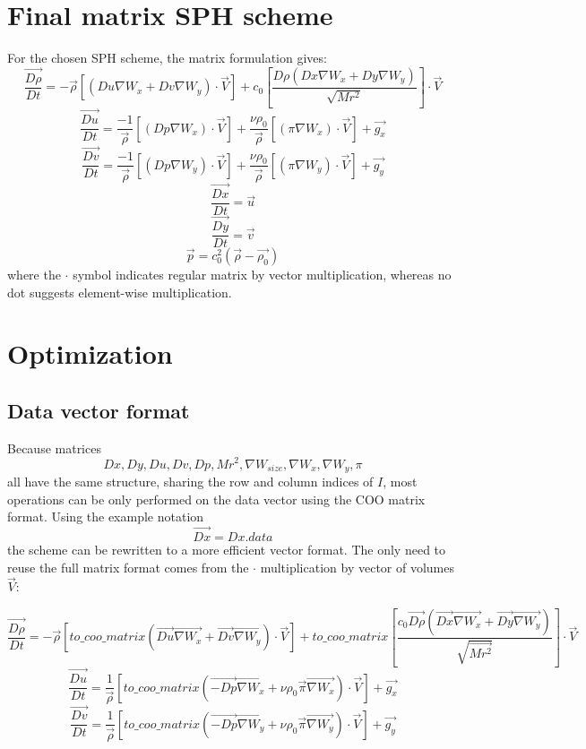 \documentclass{article}
\begin{document}
\section{Final matrix SPH scheme}
For the chosen SPH scheme, the matrix formulation gives:
$$
\overrightarrow{\frac{D\rho}{Dt}}=-\Vec{\rho}\left[\left(Du\nabla W_x + Dv \nabla W_y\right)\cdot\Vec{V}\right]
+
c_0\left[\frac{D\rho\left(Dx\nabla W_x + Dy\nabla W_y \right)}{\sqrt{Mr^2}}\right]\cdot\Vec{V}
$$
$$
\overrightarrow{\frac{Du}{Dt}}=\frac{-1}{\Vec{\rho}}\left[\left(Dp\nabla W_x\right)\cdot\Vec{V}\right]+\frac{\nu\rho_0}{\Vec{\rho}}\left[\left(\pi\nabla W_x\right)\cdot\Vec{V}\right]+\Vec{g_x}
$$
$$
\overrightarrow{\frac{Dv}{Dt}}=\frac{-1}{\Vec{\rho}}\left[\left(Dp\nabla W_y\right)\cdot\Vec{V}\right]+\frac{\nu\rho_0}{\Vec{\rho}}\left[\left(\pi\nabla W_y\right)\cdot\Vec{V}\right]+\Vec{g_y}
$$
$$\overrightarrow{\frac{Dx}{Dt}}=\Vec{u}$$
$$\overrightarrow{\frac{Dy}{Dt}}=\Vec{v}$$
$$
\vec{p}=c_0^2\left(\Vec{\rho}-\Vec{\rho_0}\right)
$$
where the $\cdot$ symbol indicates regular matrix by vector multiplication, whereas no dot suggests element-wise multiplication.
\section{Optimization}
\subsection{Data vector format}
Because matrices 
$$Dx, Dy, Du, Dv, Dp, Mr^2, \nabla W_{size}, \nabla W_x, \nabla W_y, \pi$$
all have the same structure, sharing the row and column indices of $I$, most operations can be only performed on the data vector using the COO matrix format. Using the example notation
$$\vec{Dx} = Dx.data$$
the scheme can be rewritten to a more efficient vector format. The only need to reuse the full matrix format comes from the $\cdot$ multiplication by vector of volumes $\Vec{V}$:

$$
\overrightarrow{\frac{D\rho}{Dt}}
=
-\Vec{\rho}\left[to\_coo\_matrix\left(\vec{Du}\vec{\nabla W_x} + \vec{Dv} \vec{\nabla W_y}\right)\cdot\Vec{V}\right]
+
to\_coo\_matrix\left[\frac{c_0 \Vec{D\rho}\left(\Vec{Dx}\Vec{\nabla W_x} + \Vec{Dy}\Vec{\nabla W_y} \right)}{\sqrt{\Vec{Mr^2}}}\right]\cdot\Vec{V}
$$
$$
\overrightarrow{\frac{Du}{Dt}}
=
\frac{1}{\Vec{\rho}}\left[to\_coo\_matrix\left(\vec{-Dp}\vec{\nabla W_x}+\nu\rho_0\vec{\pi}\vec{\nabla W_x}\right)\cdot\Vec{V}\right]+\Vec{g_x}
$$
$$
\overrightarrow{\frac{Dv}{Dt}}
=
\frac{1}{\Vec{\rho}}\left[to\_coo\_matrix\left(\vec{-Dp}\vec{\nabla W_y}+\nu\rho_0\vec{\pi}\vec{\nabla W_y}\right)\cdot\Vec{V}\right]+\Vec{g_y}
$$
\end{document}
